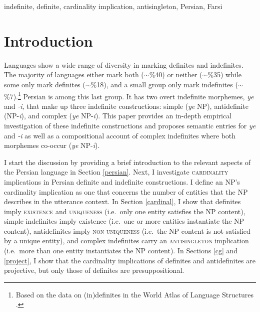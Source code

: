 \documentclass{salt}
\begin{document}
\begin{keywords}
  indefinite, definite, cardinality implication, antisingleton, Persian, Farsi
\end{keywords}


\section{Introduction}

Languages show a wide range of diversity in marking definites and indefinites. The majority of languages either mark both ($\sim$\%40) or neither ($\sim$\%35) while some only mark definites ($\sim$\%18), and a small group only mark indefinites ($\sim$\%7).\footnote{Based on the data on (in)definites in the World Atlas of Language Structures \citep{wals-37}.} Persian is among this last group. It has two overt indefinite morphemes, \emph{ye} and \emph{-i}, that make up three indefinite constructions: simple (\emph{ye} NP), antidefinite (NP-\emph{i}), and complex (\emph{ye} NP-\emph{i}). This paper provides an in-depth empirical investigation of these indefinite constructions and proposes semantic entries for \emph{ye} and \emph{-i} as well as a compositional account of complex indefinites where both morphemes co-occur (\emph{ye} NP-\emph{i}).  

I start the discussion by providing a brief introduction to the relevant aspects of the Persian language in Section \ref{persian}. Next, I investigate \textsc{cardinality} implications in Persian definite and indefinite constructions. I define an NP's cardinality implication as one that concerns the number of entities that the NP describes in the utterance context. In Section \ref{cardinal}, I show that definites imply \textsc{existence} and \textsc{uniqueness} (i.e.~only one entity satisfies the NP content), simple indefinites imply existence (i.e.~one or more entities instantiate the NP content), antidefinites imply \textsc{non-uniqueness} (i.e.~the NP content is not satisfied by a unique entity), and complex indefinites carry an \textsc{antisingleton} implication (i.e.~more than one entity instantiates the NP content). In Sections \ref{cg} and \ref{project}, I show that the cardinality implications of definites and antidefinites are projective, but only those of definites are presuppositional.
\end{document}
